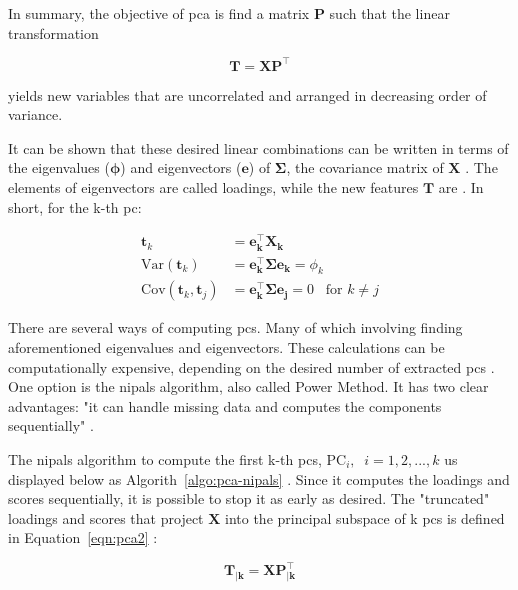 In summary, the objective of \acrshort{pca} is find a matrix $\mathbf{P}$ such that the linear transformation

\begin{equation}
	\label{eqn:pca}
	\mathbf{T=XP^\intercal}
\end{equation}

yields new variables that are uncorrelated and arranged in decreasing order of variance.

It can be shown that these desired linear combinations can be written in terms of the eigenvalues ($\mathbf{\phi}$) and eigenvectors ($\mathbf{e}$) of $\mathbf{\Sigma}$, the covariance matrix of $\mathbf{X}$ \parencite{johnson2013applied}. The elements of eigenvectors are called loadings, while the new features $\mathbf{T}$ are 
. In short, for the k-th \acrshort{pc}:

\begin{equation}
	\label{eqn:pca-eigen}
	\begin{split}
		\mathbf{t}_k & =\mathbf{e_k^\intercal X_k } \\
		\text{Var}(\mathbf{t}_k)& =  \mathbf{e_k^\intercal \Sigma e_k}=\phi_k \\
		\text{Cov}(\mathbf{t}_k, \mathbf{t}_j)& = \mathbf{e_k^\intercal \Sigma e_j}= 0 \;\;\; \text{for } k\neq j
	\end{split}
\end{equation}

There are several ways of computing \acrshort{pc}s. Many of which involving finding aforementioned eigenvalues and eigenvectors. These calculations can be computationally expensive, depending on the desired number of extracted \acrshort{pc}s \parencite{bishop2006pattern}. One option is the \acrfull{nipals} algorithm, also called Power Method. It has two clear advantages: "it can handle missing data and computes the components sequentially" \parencite{dunn2021pid}.

The \acrshort{nipals} algorithm to compute the first k-th \acrshort{pc}s, $\text{PC}_i ,\;\; i =1,2,...,k$ us displayed below as Algorith~\ref{algo:pca-nipals} \parencite{dunn2021pid} \parencite{ng2013} \parencite{nipals2017}. Since it computes the loadings and scores sequentially, it is possible to stop it as early as desired. The "truncated" loadings and scores that project $\mathbf{X}$ into the principal subspace of k \acrshort{pc}s is defined in Equation~\ref{eqn:pca2} :

\begin{equation}
	\label{eqn:pca2}
	\mathbf{T_{|k}=XP_{|k}^\intercal}
\end{equation}

